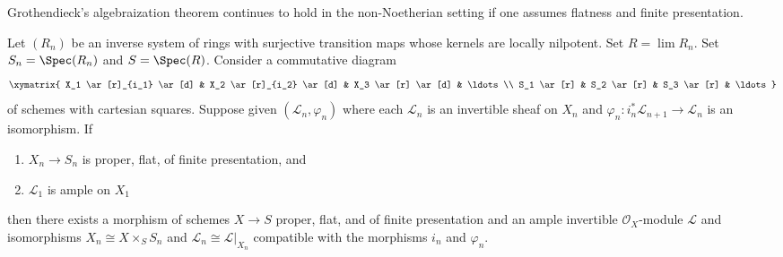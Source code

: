 \begin{lemma}
\label{lemma-polarized-strong-effectiveness}
\begin{slogan}
Grothendieck's algebraization theorem continues to hold in
the non-Noetherian setting if one assumes flatness and
finite presentation.
\end{slogan}
Let $(R_n)$ be an inverse system of rings with surjective transition maps
whose kernels are locally nilpotent. Set $R = \lim R_n$.
Set $S_n = \Spec(R_n)$ and $S = \Spec(R)$. Consider a commutative diagram
$$
\xymatrix{
X_1 \ar[r]_{i_1} \ar[d] & X_2 \ar[r]_{i_2} \ar[d] & X_3 \ar[r] \ar[d] &
\ldots \\
S_1 \ar[r] & S_2 \ar[r] & S_3 \ar[r] & \ldots
}
$$
of schemes with cartesian squares. Suppose given $(\mathcal{L}_n, \varphi_n)$
where each $\mathcal{L}_n$ is an invertible sheaf on $X_n$ and
$\varphi_n : i_n^*\mathcal{L}_{n + 1} \to \mathcal{L}_n$ is an isomorphism.
If
\begin{enumerate}
\item $X_n \to S_n$ is proper, flat, of finite presentation, and
\item $\mathcal{L}_1$ is ample on $X_1$
\end{enumerate}
then there exists a morphism of schemes $X \to S$
proper, flat, and of finite presentation
and an ample invertible $\mathcal{O}_X$-module $\mathcal{L}$
and isomorphisms $X_n \cong X \times_S S_n$ and
$\mathcal{L}_n \cong \mathcal{L}|_{X_n}$ compatible with
the morphisms $i_n$ and $\varphi_n$.
\end{lemma}

